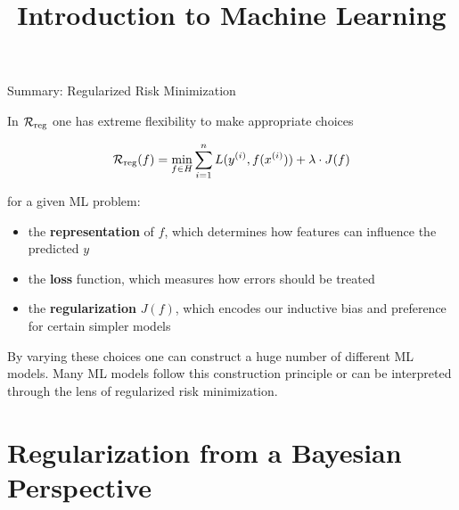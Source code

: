 



\newcommand{\titlefigure}{figure_man/bayes_reg.png}
\newcommand{\learninggoals}{
  \item Know how regularization can be motivated from a Bayesian perspective
  \item Understand the correspondence between log-prior and regularization term
}

\title{Introduction to Machine Learning}
\date{}




\begin{vbframe}{Summary: Regularized Risk Minimization}

In $\mathcal{R}_{\text{reg}}$ one has extreme flexibility to make appropriate choices

$$
\mathcal{R}_{\text{reg}}(f)= \min_{f \in H} \sum_{i=1}^n L(y^{(i)}, f(x^{(i)})) + \lambda \cdot J(f)
$$


for a given ML problem:

\begin{itemize}
  \item the \textbf{representation} of $f$, which determines how features can influence the predicted $y$
  \item the \textbf{loss} function, which measures how errors should be treated
  \item the \textbf{regularization} $J(f)$, which encodes our inductive bias and preference for certain simpler models
\end{itemize}

By varying these choices one can construct a huge number of different ML models. Many ML models follow this construction principle or can be interpreted through the lens of regularized risk minimization.

\end{vbframe}

\section{Regularization from a Bayesian Perspective}

